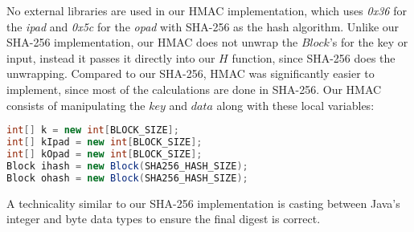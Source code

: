 No external libraries are used in our HMAC implementation, which uses \textit{0x36} for the \textit{ipad} and \textit{0x5c} for the \textit{opad} with SHA-256 as the hash algorithm. Unlike our SHA-256 implementation, our HMAC does not unwrap the $Block$'s for the key or input, instead it passes it directly into our $H$ function, since SHA-256 does the unwrapping. Compared to our SHA-256, HMAC was significantly easier to implement, since most of the calculations are done in SHA-256. 
Our HMAC consists of manipulating the $key$ and $data$ along with these local variables:
\begin{lstlisting}[language=Java]
int[] k = new int[BLOCK_SIZE];
int[] kIpad = new int[BLOCK_SIZE];
int[] kOpad = new int[BLOCK_SIZE];
Block ihash = new Block(SHA256_HASH_SIZE);
Block ohash = new Block(SHA256_HASH_SIZE);
\end{lstlisting}
A technicality similar to our SHA-256 implementation is casting between Java's integer and byte data types to ensure the final digest is correct.
